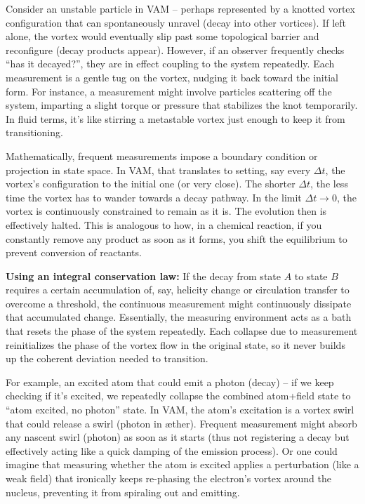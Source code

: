 \documentclass[a4paper, aps,preprint,superscriptaddress, 12pt]{revtex4}
\begin{document}
Consider an unstable particle in VAM – perhaps represented by a knotted vortex configuration that can spontaneously unravel (decay into other vortices). If left alone, the vortex would eventually slip past some topological barrier and reconfigure (decay products appear). However, if an observer frequently checks “has it decayed?”, they are in effect coupling to the system repeatedly. Each measurement is a gentle tug on the vortex, nudging it back toward the initial form. For instance, a measurement might involve particles scattering off the system, imparting a slight torque or pressure that stabilizes the knot temporarily. In fluid terms, it’s like stirring a metastable vortex just enough to keep it from transitioning.


Mathematically, frequent measurements impose a boundary condition or projection in state space. In VAM, that translates to setting, say every $\Delta t$, the vortex’s configuration to the initial one (or very close). The shorter $\Delta t$, the less time the vortex has to wander towards a decay pathway. In the limit $\Delta t \to 0$, the vortex is continuously constrained to remain as it is. The evolution then is effectively halted. This is analogous to how, in a chemical reaction, if you constantly remove any product as soon as it forms, you shift the equilibrium to prevent conversion of reactants.


\textbf{Using an integral conservation law:} If the decay from state $A$ to state $B$ requires a certain accumulation of, say, helicity change or circulation transfer to overcome a threshold, the continuous measurement might continuously dissipate that accumulated change. Essentially, the measuring environment acts as a bath that resets the phase of the system repeatedly. Each collapse due to measurement reinitializes the phase of the vortex flow in the original state, so it never builds up the coherent deviation needed to transition.


For example, an excited atom that could emit a photon (decay) – if we keep checking if it’s excited, we repeatedly collapse the combined atom+field state to “atom excited, no photon” state. In VAM, the atom’s excitation is a vortex swirl that could release a swirl (photon in æther). Frequent measurement might absorb any nascent swirl (photon) as soon as it starts (thus not registering a decay but effectively acting like a quick damping of the emission process). Or one could imagine that measuring whether the atom is excited applies a perturbation (like a weak field) that ironically keeps re-phasing the electron’s vortex around the nucleus, preventing it from spiraling out and emitting.
\end{document}
